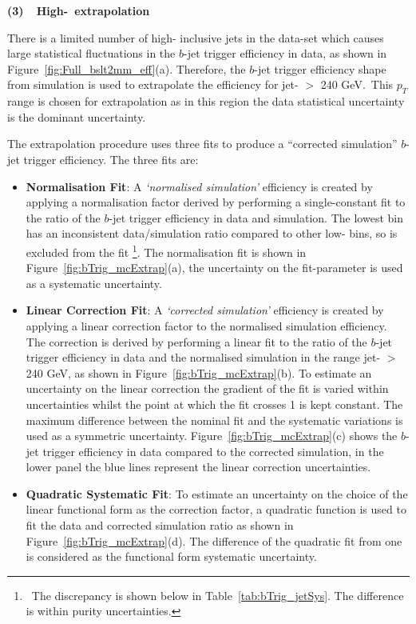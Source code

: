 \FloatBarrier

\newpage
\noindent
\textbf{(3)~~High-\pT{}~extrapolation}
\label{sec:trig-highPtExtrap}

There is a limited number of high-\pT{} inclusive jets in the data-set which
causes large statistical fluctuations in the $b$-jet trigger efficiency in data, as shown in Figure~\ref{fig:Full_bslt2mm_eff}(a).
Therefore, the $b$-jet trigger efficiency shape from simulation is used to extrapolate the efficiency for jet-\pT{} $>$ 240 GeV.
$\,$This $p_T$ range is chosen for extrapolation as in this region the data statistical uncertainty is the dominant uncertainty.

The extrapolation procedure uses three fits to produce a ``corrected simulation'' $b$-jet trigger efficiency.
The three fits are:
\vspace{-0.5em}
\begin{itemize}[leftmargin=*]  
  \setlength\itemsep{0.5em}
\item \textbf{Normalisation Fit}: A \textit{`normalised simulation'} efficiency is created by applying
  a normalisation factor derived by performing a single-constant fit
  to the ratio of the $b$-jet trigger efficiency in data and simulation.
  The lowest \pT{} bin has an inconsistent data/simulation ratio compared to other low-\pT{} bins, so is excluded from the fit
  \footnote{\ The discrepancy is shown below in Table~\ref{tab:bTrig_jetSys}. The difference is within purity uncertainties.}.
  The normalisation fit is shown in Figure~\ref{fig:bTrig_mcExtrap}(a),
  the uncertainty on the fit-parameter is used as a systematic uncertainty.
  
\item \textbf{Linear Correction Fit}:
  A \textit{`corrected simulation'} efficiency is created by applying a linear correction factor to the normalised simulation efficiency.
  The correction is derived by performing a linear fit to the ratio of the $b$-jet trigger efficiency in data and the normalised simulation
  in the range jet-\pT{} $>$ 240 GeV, as shown in Figure~\ref{fig:bTrig_mcExtrap}(b).
  To estimate an uncertainty on the linear correction the gradient of the fit is varied within uncertainties
  whilst the point at which the fit crosses 1 is kept constant.
  The maximum difference between the nominal fit and the systematic variations is used as a symmetric uncertainty.
  Figure~\ref{fig:bTrig_mcExtrap}(c) shows the $b$-jet trigger efficiency in data compared to the corrected simulation,
  in the lower panel the blue lines represent the linear correction uncertainties.
  
\item \textbf{Quadratic Systematic Fit}: 
  To estimate an uncertainty on the choice of the linear functional form as the correction factor,
  a quadratic function is used to fit the data and corrected simulation ratio
  as shown in Figure~\ref{fig:bTrig_mcExtrap}(d).
  The difference of the quadratic fit from one is considered as the functional form systematic uncertainty.
\end{itemize}

